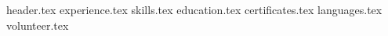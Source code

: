 \documentclass[a4paper,12pt]{article}
\begin{document}
\xselectlanguage{\lang}

{header.tex}
{experience.tex}
{skills.tex}
{education.tex}
{certificates.tex}
{languages.tex}
{volunteer.tex}
\end{document}
